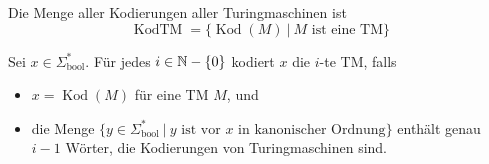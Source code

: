 \begin{definition}
Die Menge aller Kodierungen aller Turingmaschinen ist
\[
\operatorname{KodTM} = \{ \operatorname{Kod}(M) \ |\ M \text{ ist eine TM} \}
\]
\end{definition}

\begin{definition}
Sei \( x \in \Sigma_\text{bool}^* \). Für jedes \(i \in \mathbb{N} - \{0\}\) kodiert \(x\) die \(i\)-te TM, falls
\begin{itemize}
  \item \( x = \operatorname{Kod}(M) \) für eine TM \(M\), und
  \item die Menge \( \{ y \in \Sigma_\text{bool}^* \ |\ y \text{ ist vor } x \text{ in kanonischer Ordnung} \} \) enthält genau \(i - 1\) Wörter, die Kodierungen von Turingmaschinen sind.
\end{itemize}

\end{definition}
